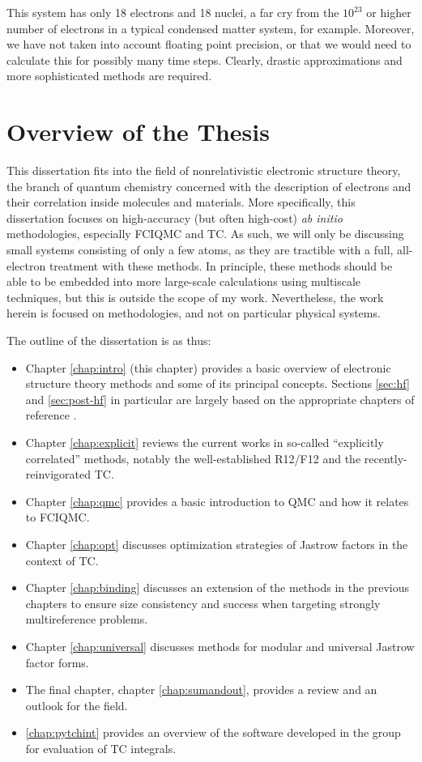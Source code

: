 This system has only 18 electrons and 18 nuclei, a far cry from the $10^{23}$ or higher number of electrons in a typical condensed matter system, for example. Moreover, we have not taken into account floating point precision, or that we would need to calculate this for possibly many time steps. Clearly, drastic approximations and more sophisticated methods are required.

\section{Overview of the Thesis}

This dissertation fits into the field of nonrelativistic electronic structure theory, the branch of quantum chemistry concerned with the description of electrons and their correlation inside molecules and materials. More specifically, this dissertation focuses on high-accuracy (but often high-cost) \emph{ab initio} methodologies, especially \gls{FCIQMC} and \gls{TC}. As such, we will only be discussing small systems consisting of only a few atoms, as they are tractible with a full, all-electron treatment with these methods. In principle, these methods should be able to be embedded \cite{jonesEmbedding2020,christlmaierFull2022} into more large-scale calculations using multiscale techniques, but this is outside the scope of my work. Nevertheless, the work herein is focused on methodologies, and not on particular physical systems.

The outline of the dissertation is as thus:
\begin{itemize}
    \item Chapter \ref{chap:intro} (this chapter) provides a basic overview of electronic structure theory methods and some of its principal concepts. Sections \ref{sec:hf} and \ref{sec:post-hf} in particular are largely based on the appropriate chapters of reference .
    \item Chapter \ref{chap:explicit} reviews the current works in so-called ``explicitly correlated'' methods, notably the well-established R12/F12 and the recently-reinvigorated \gls{TC}.
    \item Chapter \ref{chap:qmc} provides a basic introduction to \gls{QMC} and how it relates to \gls{FCIQMC}.
    \item Chapter \ref{chap:opt} discusses optimization strategies of Jastrow factors in the context of \gls{TC}.
    \item Chapter \ref{chap:binding} discusses an extension of the methods in the previous chapters to ensure size consistency and success when targeting strongly multireference problems.
    \item Chapter \ref{chap:universal} discusses methods for modular and universal Jastrow factor forms.
    \item The final chapter, chapter \ref{chap:sumandout}, provides a review and an outlook for the field.
    \item \autoref{chap:pytchint} provides an overview of the software \pytchint developed in the group for evaluation of \gls{TC} integrals.
\end{itemize}


